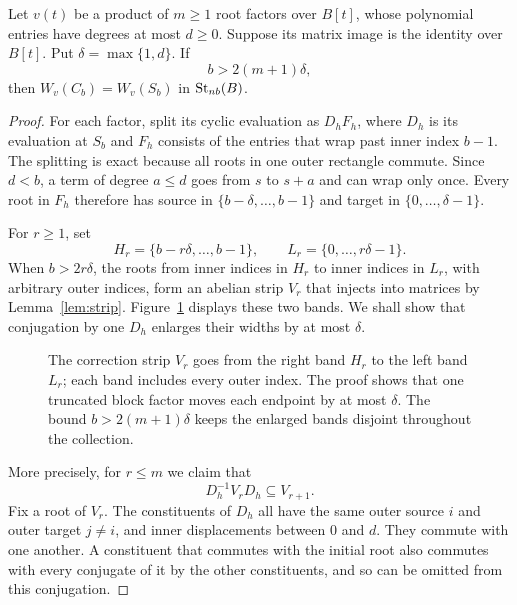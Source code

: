 \begin{lemma}\label{lem:wrap}
Let $v(t)$ be a product of $m\geq1$ root factors over $B[t]$,
whose polynomial entries have degrees at most $d\geq0$.
Suppose its matrix image is the identity over $B[t]$.
Put $\delta=\max\{1,d\}$.  If
\[
 b>2(m+1)\delta,
\]
then $W_v(C_b)=W_v(S_b)$ in $\operatorname{St}_{nb}(B)$.
\end{lemma}

\begin{proof}
For each factor, split its cyclic evaluation as $D_hF_h$, where
$D_h$ is its evaluation at $S_b$ and $F_h$ consists of the entries
that wrap past inner index $b-1$.  The splitting is exact because
all roots in one outer rectangle commute.  Since $d<b$, a term
of degree $a\leq d$ goes from $s$ to $s+a$ and can wrap only once.
Every root in $F_h$ therefore has source in
$\{b-\delta,\ldots,b-1\}$ and target in
$\{0,\ldots,\delta-1\}$.

For $r\geq1$, set
\[
 H_r=\{b-r\delta,\ldots,b-1\},\qquad
 L_r=\{0,\ldots,r\delta-1\}.
\]
When $b>2r\delta$, the roots from inner indices in $H_r$ to
inner indices in $L_r$, with arbitrary outer indices, form an
abelian strip $V_r$ that injects into matrices by
Lemma~\ref{lem:strip}.  Figure~\ref{fig:wrap-strip} displays these
two bands.  We shall show that conjugation by one $D_h$ enlarges
their widths by at most $\delta$.

\begin{figure}[htbp]
\centering
{}
\caption{The correction strip $V_r$ goes from the right band
$H_r$ to the left band $L_r$; each band includes every outer index.
The proof shows that one truncated block factor moves each endpoint
by at most $\delta$.  The bound $b>2(m+1)\delta$ keeps the enlarged
bands disjoint throughout the collection.}
\label{fig:wrap-strip}
\end{figure}

More precisely, for $r\leq m$ we claim that
\begin{equation}\label{eq:strip-enlargement}
 D_h^{-1}V_rD_h\subseteq V_{r+1}.
\end{equation}
Fix a root of $V_r$.  The constituents of $D_h$ all have the
same outer source $i$ and outer target $j\ne i$, and inner
displacements between $0$ and $d$.  They commute with one
another.  A constituent that commutes with the initial root
also commutes with every conjugate of it by the other
constituents, and so can be omitted from this conjugation.


\end{proof}
